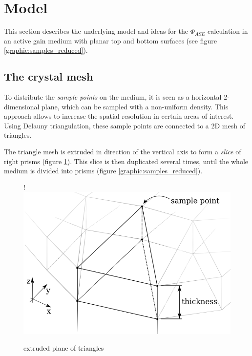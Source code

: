 \section{Model}

This section describes the underlying model and ideas for the $\Phi_{ASE}$
calculation in an active gain medium with planar top and bottom surfaces (see
figure \ref{graphic:samples_reduced}).



\subsection{The crystal mesh} \label{subsec:meshSampling}

To distribute the \emph{sample points} on the medium, it is seen as a
horizontal 2-dimensional plane, which can be sampled with a non-uniform
density. This approach allows to increase the spatial resolution in certain
areas of interest. Using Delauny triangulation, these sample points are
connected to a 2D mesh of triangles.

The triangle mesh is extruded in direction of the vertical axis to form a
\emph{slice} of right prisms (figure \ref{graphic:extruded_mesh}). This
slice is then duplicated several times, until the whole medium is divided into
prisms (figure \ref{graphic:samples_reduced}).

\begin{figure}
  \centerline{
     {!} {\includegraphics{graphics/delauny_3.png}}
  }
  \caption{extruded plane of triangles}
  \label{graphic:extruded_mesh}
\end{figure}

